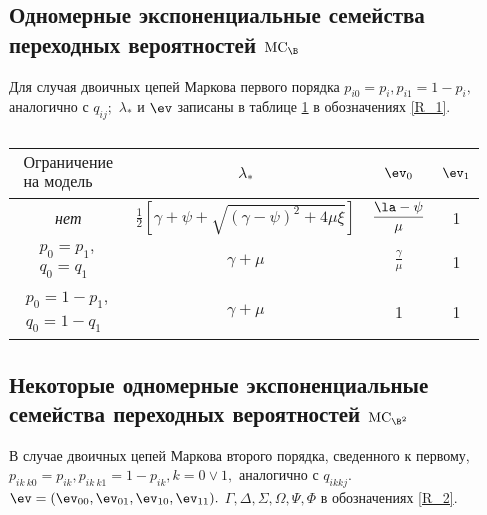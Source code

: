\subsection{Одномерные экспоненциальные семейства переходных вероятностей $\mathrm{MC}_\B$}

Для случая двоичных цепей Маркова первого порядка $p_{i0} = p_{i}, p_{i1} = 1 - p_{i},$ аналогично с $q_{ij};$ $\lambda_\ast$ и $\ev$ записаны в таблице \ref{tab:tableFIRST} в обозначениях \eqref{R_1}.
 
\begin{table}[h!]
  \begin{center}
    \caption{ }
    \label{tab:tableFIRST}
    \begin{tabular}{c|c|c|c}
     \toprule %
       $\begin{array}{c}
      \textrm{Ограничение}\\
      \textrm{на модель}
      \end{array}$ & $\lambda_\ast$ & ${\ev}_0$ & ${\ev}_1$\\
      \toprule
      \textit{нет} & $\displaystyle \frac{1}{2} \left[ \gamma + \psi + \sqrt{(\gamma - \psi)^2 + 4 \mu \xi} \right]$ & $\displaystyle \frac{\la - \psi}{\mu} $ & 1\\
\midrule
      $\begin{array}{l}
      p_0 = p_1,\\
      q_0 = q_1
      \end{array}$ & $\gamma + \mu$ & $ \displaystyle \frac{\gamma}{\mu}$ & 1\\
\midrule
      $\begin{array}{l}
      p_0 = 1 - p_1,\\
      q_0 = 1 - q_1
      \end{array}$ & $\gamma + \mu$ & 1 & 1\\
\bottomrule
    \end{tabular}
  \end{center}
\end{table}

\subsection{Некоторые одномерные экспоненциальные семейства переходных вероятностей $\mathrm{MC}_{\B^2}$}
\label{EXP_FAM_SECOND}

В случае двоичных цепей Маркова второго порядка, сведенного к первому, $p_{ik \ k0} = p_{ik}, p_{ik \ k1} = 1 - p_{ik}, k = 0 \vee 1,$ аналогично с $q_{ik kj}.$ $\ev = ({\ev}_{00}, {\ev}_{01}, {\ev}_{10}, {\ev}_{11}).$ $\Gamma, \Delta, \Sigma, \Omega, \Psi, \Phi$ в обозначениях \eqref{R_2}.

